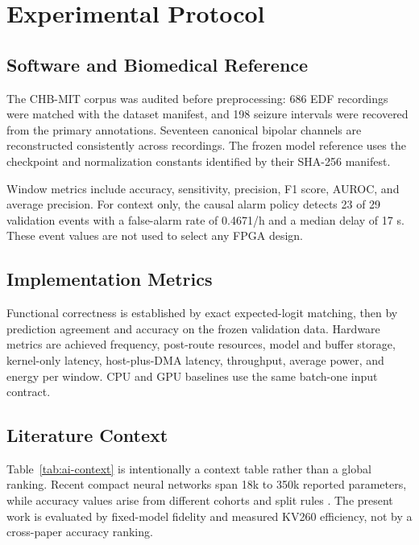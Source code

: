 \section{Experimental Protocol}

\subsection{Software and Biomedical Reference}

The CHB-MIT corpus was audited before preprocessing: 686 EDF recordings were
matched with the dataset manifest, and 198 seizure intervals were recovered
from the primary annotations. Seventeen canonical bipolar channels are
reconstructed consistently across recordings. The frozen model reference uses
the checkpoint and normalization constants identified by their SHA-256 manifest.

Window metrics include accuracy, sensitivity, precision, F1 score, AUROC, and
average precision. For context only, the causal alarm policy detects 23 of 29
validation events with a false-alarm rate of 0.4671/h and a median delay of
17 s. These event values are not used to select any FPGA design.

\subsection{Implementation Metrics}

Functional correctness is established by exact expected-logit matching, then
by prediction agreement and accuracy on the frozen validation data. Hardware
metrics are achieved frequency, post-route resources, model and buffer storage,
kernel-only latency, host-plus-DMA latency, throughput, average power, and
energy per window. CPU and GPU baselines use the same batch-one input contract.

\subsection{Literature Context}

Table~\ref{tab:ai-context} is intentionally a context table rather than a
global ranking. Recent compact neural networks span 18k to 350k reported
parameters, while accuracy values arise from different cohorts and split rules
\cite{lmpseiznet2024,kashefi2025,gu2026}. The present work is evaluated by
fixed-model fidelity and measured KV260 efficiency, not by a cross-paper
accuracy ranking.


